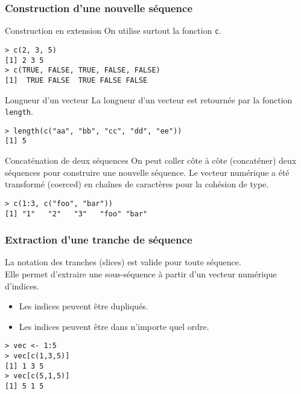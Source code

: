 \documentclass[10pt]{beamer}
\begin{document}
\begin{frame}[fragile]
  \frametitle{Construction d'une nouvelle séquence}
  \begin{alertblock}{Construction en extension}
    On utilise surtout la fonction \alert{\texttt{c}}.
    \begin{lstlisting}
> c(2, 3, 5)
[1] 2 3 5
> c(TRUE, FALSE, TRUE, FALSE, FALSE)
[1]  TRUE FALSE  TRUE FALSE FALSE
\end{lstlisting}
  \end{alertblock}

  \begin{block}{Longueur d'un vecteur}
    La longueur d’un vecteur est retournée par la fonction \texttt{length}.
    \begin{lstlisting}
> length(c("aa", "bb", "cc", "dd", "ee"))
[1] 5
    \end{lstlisting}
  \end{block}

  \begin{block}{Concaténation de deux séquences}
    On peut coller côte à côte (concaténer) deux séquences pour construire une nouvelle séquence.
    Le vecteur numérique a été transformé (\alert{coerced}) en chaînes de caractères pour la cohésion de type.
    \begin{lstlisting}
> c(1:3, c("foo", "bar"))
[1] "1"   "2"   "3"   "foo" "bar"
\end{lstlisting}
  \end{block}
\end{frame}
\begin{frame}[fragile]
  \frametitle{Extraction d'une tranche de séquence}
La notation des tranches (\alert{slices}) est valide pour toute séquence. \\
Elle permet d’extraire une sous-séquence à partir d’un \alert{vecteur numérique d’indices}.
\begin{itemize}
\item Les indices peuvent être dupliqués.
\item Les indices peuvent être dans n'importe quel ordre.
\end{itemize}
\begin{lstlisting}
> vec <- 1:5
> vec[c(1,3,5)]
[1] 1 3 5
> vec[c(5,1,5)]
[1] 5 1 5
\end{lstlisting}
\end{frame}
\end{document}

